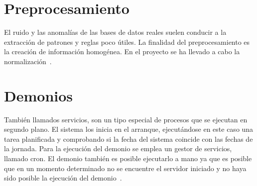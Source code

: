 \section{Preprocesamiento}
El ruido y las anomalías de las bases de datos reales suelen conducir a la extracción de patrones y reglas poco útiles. La finalidad del preprocesamiento es la creación de información homogénea. En el proyecto se ha llevado a cabo la normalización~\cite{garcia_data_2015}.

\section{Demonios}
También llamados servicios, son un tipo especial de procesos que se ejecutan en segundo plano.
El sistema los inicia en el arranque, ejecutándose en este caso una tarea planificada y comprobando si la fecha del sistema coincide con las fechas de la jornada. Para la ejecución del demonio se emplea un gestor de servicios, llamado cron. El demonio también es posible ejecutarlo a mano ya que es posible que en un momento determinado no se encuentre el servidor iniciado y no haya sido posible la ejecución del demonio~\cite{servicios_linux_2013}.